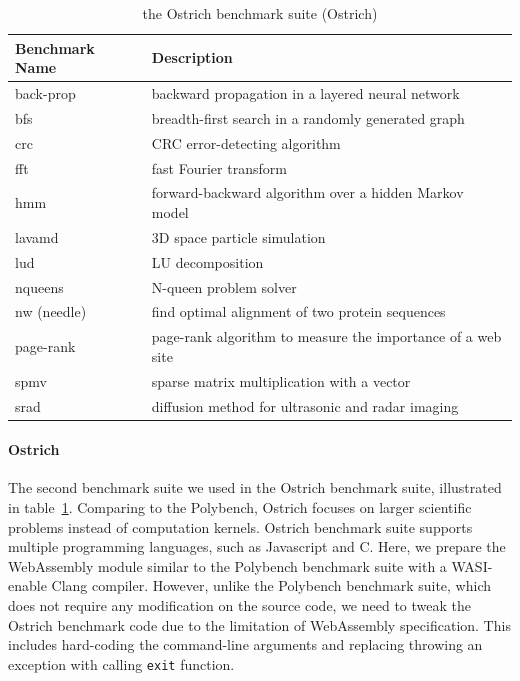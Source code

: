 \begin{table}
    \centering
    \begin{tabular}{|l|l|}
        \hline
        \textbf{Benchmark Name} & \textbf{Description}                                        \\ \hline
        back-prop               & backward propagation in a layered neural network            \\ \hline
        bfs                     & breadth-first search in a randomly generated graph          \\ \hline
        crc                     & CRC error-detecting algorithm                               \\ \hline
        fft                     & fast Fourier transform                                      \\ \hline
        hmm                     & forward-backward algorithm over a hidden Markov model       \\ \hline
        lavamd                  & 3D space particle simulation                                \\ \hline
        lud                     & LU decomposition                                            \\ \hline
        nqueens                 & N-queen problem solver                                      \\ \hline
        nw (needle)             & find optimal alignment of two protein sequences             \\ \hline
        page-rank               & page-rank algorithm to measure the importance of a web site \\ \hline
        spmv                    & sparse matrix multiplication with a vector                  \\ \hline
        srad                    & diffusion method for ultrasonic and radar imaging           \\ \hline
    \end{tabular}
    \caption{the Ostrich benchmark suite (Ostrich)}
    \label{tbl:ostrich}
\end{table}

\paragraph{Ostrich}
The second benchmark suite we used in the Ostrich benchmark suite\cite{ostrich}, illustrated in table~\ref{tbl:ostrich}. Comparing to the Polybench, Ostrich focuses on larger scientific problems instead of computation kernels. Ostrich benchmark suite supports multiple programming languages, such as Javascript and C. Here, we prepare the WebAssembly module similar to the Polybench benchmark suite with a WASI-enable Clang compiler. However, unlike the Polybench benchmark suite, which does not require any modification on the source code, we need to tweak the Ostrich benchmark code due to the limitation of WebAssembly specification. This includes hard-coding the command-line arguments and replacing throwing an exception with calling \texttt{exit} function.

